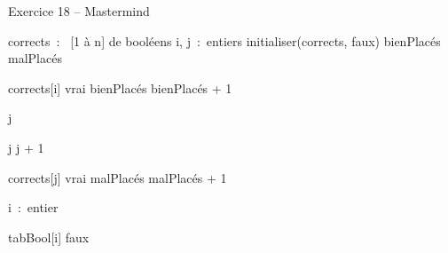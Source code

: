 \begin{Emphase}{Exercice 18 -- Mastermind}

\begin{pseudoN}


    \Decl corrects~:~ [1 à n] de booléens
    \Decl i, j~:~entiers
    \Let initialiser(corrects, faux)
    \Let bienPlacés 
    \Let malPlacés 



            \Let corrects[i] \Gets vrai
            \Let bienPlacés \Gets bienPlacés + 1

        \Else

            \Let j 


                \Let j \Gets j + 1

            \EndWhile


                \Let corrects[j] \Gets vrai
                \Let malPlacés \Gets malPlacés + 1

            \EndIf

        \EndIf

    \EndFor

\EndModule

    \Empty


    \Decl i~:~entier


        \Let tabBool[i] \Gets faux

    \EndFor

\EndModule

\end{pseudoN}

\end{Emphase}


